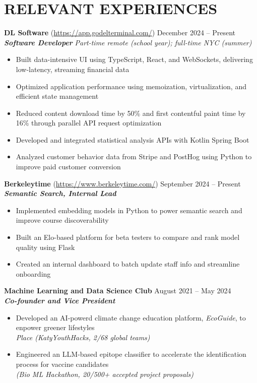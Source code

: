 \section*{RELEVANT EXPERIENCES}

\noindent
\textbf{DL Software} (\href{https://app.godelterminal.com/}{https://app.godelterminal.com/}) \hfill December 2024 -- Present \\
\textbf{\textit{Software Developer}} \hfill \textit{Part-time remote (school year); full-time NYC (summer)}
\begin{itemize}
	\item Built data-intensive UI using TypeScript, React, and WebSockets, delivering low-latency, streaming financial data
	\item Optimized application performance using memoization, virtualization, and efficient state management
	\item Reduced content download time by 50\% and first contentful paint time by 16\% through parallel API request optimization
	\item Developed and integrated statistical analysis APIs with Kotlin Spring Boot
	\item Analyzed customer behavior data from Stripe and PostHog using Python to improve paid customer conversion
\end{itemize}

\noindent
\textbf{Berkeleytime} (\href{https://www.berkeleytime.com/}{https://www.berkeleytime.com/}) \hfill September 2024 -- Present \\
\textbf{\textit{Semantic Search, Internal Lead}}
\begin{itemize}
	\item Implemented embedding models in Python to power semantic search and improve course discoverability
	\item Built an Elo-based platform for beta testers to compare and rank model quality using Flask
	\item Created an internal dashboard to batch update staff info and streamline onboarding
\end{itemize}

\noindent
\textbf{Machine Learning and Data Science Club} \hfill August 2021 -- May 2024 \\
\textbf{\textit{Co-founder and Vice President}}
\begin{itemize}
	\item Developed an AI-powerd climate change education platform, \textit{EcoGuide}, to enpower greener lifestyles \\ \textit{ Place (KatyYouthHacks, 2/68 global teams)}
	\item Engineered an LLM-based epitope classifier to accelerate the identification process for vaccine candidates \\ \textit{(Bio ML Hackathon, 20/500+ accepted project proposals)}
\end{itemize}

